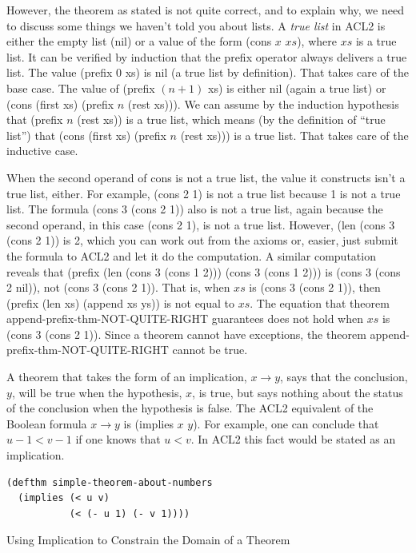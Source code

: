 However, the theorem as stated
is not quite correct,
and to explain why, we need to discuss
some things we haven't told you about lists.
\label{true-list-def}
A \emph{true list} in ACL2 is either the empty list (nil)
or a value of the form (cons $x$ $xs$),
where $xs$ is a true list.
It can be verified by induction that
the prefix operator always delivers a true list.
The value (prefix 0 xs) is nil (a true list by definition).
That takes care of the base case.
The value of (prefix $(n+1)$ xs) is either nil (again a true list)
or (cons (first xs) (prefix $n$ (rest xs))).
We can assume by the induction hypothesis that
(prefix $n$ (rest xs)) is a true list,
which means (by the definition of ``true list'')
that (cons (first xs) (prefix $n$ (rest xs))) is a true list.
That takes care of the inductive case.

When the second operand of cons is not a true list,
the value it constructs isn't a true list, either.
For example, (cons 2 1) is not a true list because 1 is not a true list.
The formula (cons 3 (cons 2 1)) also is not a true list,
again because the second operand,
in this case (cons 2 1), is not a true list.
However, (len (cons 3 (cons 2 1)) is 2, which you can work
out from the axioms or, easier,
just submit the formula to ACL2 and let it do the computation.
A similar computation reveals that
(prefix (len (cons 3 (cons 1 2))) (cons 3 (cons 1 2)))
is (cons 3 (cons 2 nil)), not (cons 3 (cons 2 1)).
That is, when $xs$ is (cons 3 (cons 2 1)),
then (prefix (len xs) (append xs ys)) is not equal to $xs$.
The equation that theorem append-prefix-thm-NOT-QUITE-RIGHT
guarantees does not hold when $xs$ is (cons 3 (cons 2 1)).
Since a theorem cannot have exceptions,
the theorem append-prefix-thm-NOT-QUITE-RIGHT
cannot be true.

\begin{aside}
A theorem that takes the form of an implication, $x \rightarrow y$,
says that the conclusion, $y$, will be true when the hypothesis, $x$,
is true, but says nothing about the status of the conclusion when
the hypothesis is false. The ACL2 equivalent of the Boolean formula $x \rightarrow y$
is (implies $x$ $y$).
For example, one can conclude that $u - 1 < v - 1$
if one knows that $u < v$.
In ACL2 this fact would be stated as an implication.
\begin{Verbatim}
(defthm simple-theorem-about-numbers
  (implies (< u v)
           (< (- u 1) (- v 1))))
\end{Verbatim}
\caption{Using Implication to Constrain the Domain of a Theorem}
\label{thm-with-implies}
\end{aside}

